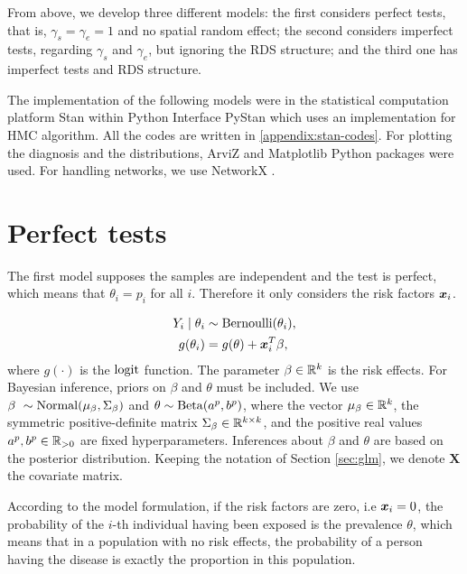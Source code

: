 From above, we develop three different models: the first considers perfect
tests, that is, $\gamma_s = \gamma_e = 1$ and no spatial random effect;
the second considers imperfect tests, regarding $\gamma_s$ and $\gamma_e$,
but ignoring the RDS structure; and the third one has imperfect tests and
RDS structure. 

The implementation of the following models were in the statistical computation
platform Stan \cite{carpenter2017stan} within Python Interface PyStan
\cite{pystan} which uses an implementation for HMC algorithm. All the codes
are written in \autoref{appendix:stan-codes}. For plotting the diagnosis and
the distributions, ArviZ \cite{arviz_2019} and Matplotlib \cite{Hunter_2007}
Python packages were used. For handling networks, we use NetworkX
\cite{hagberg2008exploring}.

\section{Perfect tests}

The first model supposes the samples are independent and the test is perfect,
which means that $\theta_i = p_i$ for all $i$. Therefore it only considers the risk factors $\boldsymbol{x}_i$.

\begin{equation}
  \label{model:perfect-tests}
  \begin{aligned}
    Y_i \mid \theta_i & \sim \operatorname{Bernoulli}(\theta_i),      \\
    g(\theta_i)       & = g(\theta) + \boldsymbol{x}_i^T\beta,
  \end{aligned}
\end{equation}
where $g(\cdot)$ is the $\operatorname{logit}$ function.
The parameter $\beta \in \mathbb{R}^{k}$ is the risk effects. For Bayesian inference, priors on
$\beta$ and $\theta$ must be included. We use $\beta ~ \sim \operatorname{Normal}(\mu_{\beta}, \Sigma_{\beta})$
and $\theta \sim \operatorname{Beta}(a^{p}, b^p)$, where the vector $\mu_{\beta}
  \in \mathbb{R}^{k}$, the symmetric positive-definite matrix $\Sigma_{\beta} \in
  \mathbb{R}^{k\times k}$, and the positive real values $a^p, b^p \in \mathbb{R}_{>0}$ are fixed
hyperparameters. Inferences about $\beta$ and $\theta$ are based on the
posterior distribution. Keeping the notation of
Section \ref{sec:glm}, we denote $\boldsymbol{X}$ the covariate matrix.

\begin{remark}
  \label{remark:interpretation-prevalence}
  According to the model formulation, if the risk factors are zero, i.e $\boldsymbol{x}_i
    = 0$, the probability of the $i$-th individual having been exposed is the prevalence $\theta$, which means that in
  a population with no risk effects, the probability of a person having the
  disease is exactly the proportion in this population.
\end{remark}

